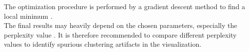 The optimization procedure is performed by a gradient descent method to find a local minimum \cite{tsne_matlab}. \\
The final results may heavily depend on the chosen parameters, especially the perplexity value \cite{wattenberg2016how}. It is therefore recommended to compare different perplexity values to identify spurious clustering artifacts in the visualization.
